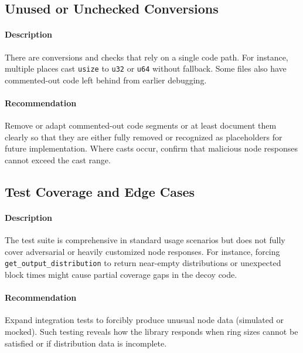 \documentclass[12pt,a4paper]{article}
\begin{document}

\subsection{Unused or Unchecked Conversions}
\label{sec:monero-wallet-unused}
\paragraph{Description}
There are conversions and checks that rely on a single code path. 
For instance, multiple places cast \texttt{usize} to \texttt{u32} or 
\texttt{u64} without fallback. Some files also have commented-out code 
left behind from earlier debugging.

\paragraph{Recommendation}
Remove or adapt commented-out code segments or at least document them clearly 
so that they are either fully removed or recognized as placeholders for future 
implementation. Where casts occur, confirm that malicious node responses 
cannot exceed the cast range.

\subsection{Test Coverage and Edge Cases}
\label{sec:monero-wallet-test-coverage}
\paragraph{Description}
The test suite is comprehensive in standard usage scenarios but does not fully 
cover adversarial or heavily customized node responses. For instance, forcing 
\texttt{get\_output\_distribution} to return near-empty distributions or 
unexpected block times might cause partial coverage gaps in the decoy code.

\paragraph{Recommendation}
Expand integration tests to forcibly produce unusual node data (simulated or 
mocked). Such testing reveals how the library responds when ring sizes 
cannot be satisfied or if distribution data is incomplete.
\end{document}
